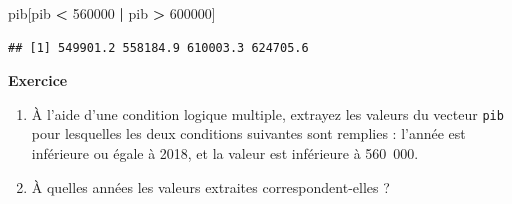 \documentclass[
  11pt,
]{book}
\newenvironment{Shaded}{\begin{snugshade}}{\end{snugshade}}
\newcommand{\DecValTok}[1]{\textcolor[rgb]{0.00,0.00,0.81}{#1}}
\newcommand{\NormalTok}[1]{#1}
\newcommand{\SpecialCharTok}[1]{\textcolor[rgb]{0.81,0.36,0.00}{\textbf{#1}}}
\providecommand{\tightlist}{%
  \setlength{\itemsep}{0pt}\setlength{\parskip}{0pt}}
\numberwithin{equation}{section}
\numberwithin{countremarque}{section}
\newenvironment{greenbox}{
  \begin{tcolorbox}[breakable, colback=vert,coltext=black,
                  colframe=grisfonce]}
 {\end{tcolorbox}}
\begin{document}
\begin{Shaded}
\begin{Highlighting}[]
\NormalTok{pib[pib }\SpecialCharTok{\textless{}} \DecValTok{560000} \SpecialCharTok{|}\NormalTok{ pib }\SpecialCharTok{\textgreater{}} \DecValTok{600000}\NormalTok{]}
\end{Highlighting}
\end{Shaded}

\begin{lstlisting}
## [1] 549901.2 558184.9 610003.3 624705.6
\end{lstlisting}

\begin{greenbox}

\textbf{Exercice}

\begin{enumerate}
\def\labelenumi{\arabic{enumi}.}
\tightlist
\item
  À l'aide d'une condition logique multiple, extrayez les valeurs du vecteur \texttt{pib} pour lesquelles les deux conditions suivantes sont remplies : l'année est inférieure ou égale à 2018, et la valeur est inférieure à 560~000.
\item
  À quelles années les valeurs extraites correspondent-elles ?
\end{enumerate}

\end{greenbox}
\end{document}
